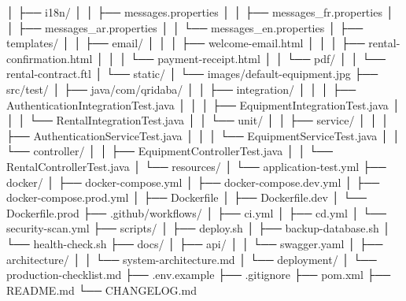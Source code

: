 │   ├── i18n/
│   │   ├── messages.properties
│   │   ├── messages_fr.properties
│   │   ├── messages_ar.properties
│   │   └── messages_en.properties
│   ├── templates/
│   │   ├── email/
│   │   │   ├── welcome-email.html
│   │   │   ├── rental-confirmation.html
│   │   │   └── payment-receipt.html
│   │   └── pdf/
│   │       └── rental-contract.ftl
│   └── static/
│       └── images/default-equipment.jpg
├── src/test/
│   ├── java/com/qridaba/
│   │   ├── integration/
│   │   │   ├── AuthenticationIntegrationTest.java
│   │   │   ├── EquipmentIntegrationTest.java
│   │   │   └── RentalIntegrationTest.java
│   │   └── unit/
│   │       ├── service/
│   │       │   ├── AuthenticationServiceTest.java
│   │       │   └── EquipmentServiceTest.java
│   │       └── controller/
│   │           ├── EquipmentControllerTest.java
│   │           └── RentalControllerTest.java
│   └── resources/
│       └── application-test.yml
├── docker/
│   ├── docker-compose.yml
│   ├── docker-compose.dev.yml
│   ├── docker-compose.prod.yml
│   ├── Dockerfile
│   ├── Dockerfile.dev
│   └── Dockerfile.prod
├── .github/workflows/
│   ├── ci.yml
│   ├── cd.yml
│   └── security-scan.yml
├── scripts/
│   ├── deploy.sh
│   ├── backup-database.sh
│   └── health-check.sh
├── docs/
│   ├── api/
│   │   └── swagger.yaml
│   ├── architecture/
│   │   └── system-architecture.md
│   └── deployment/
│       └── production-checklist.md
├── .env.example
├── .gitignore
├── pom.xml
├── README.md
└── CHANGELOG.md

